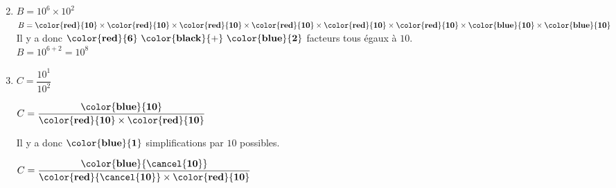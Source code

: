         \begin{enumerate}
            \setcounter{enumi}{1}
            \item $B=10^6\times 10^2$\\
            $B=\mathbf{\color{red}{10}} \times \mathbf{\color{red}{10}}\times \mathbf{\color{red}{10}}\times \mathbf{\color{red}{10}}\times \mathbf{\color{red}{10}}\times \mathbf{\color{red}{10}} \times \mathbf{\color{blue}{10}} \times \mathbf{\color{blue}{10}}$\\
            Il y a donc $\mathbf{\color{red}{6}~\color{black}{+}~\color{blue}{2}}$ facteurs tous égaux à $10$.\\
            $B=10^{6+2} = 10^{8}$
            \item $C=\dfrac{10^1}{10^2}$

            \medskip
            $C=\dfrac{\mathbf{\color{blue}{10}}}{\mathbf{\color{red}{10}} \times \mathbf{\color{red}{10}}}$

            \medskip
            Il y a donc $\mathbf{\color{blue}{1}}$ simplifications par $10$ possibles.

            \medskip
            $C=\dfrac{\mathbf{\color{blue}{\cancel{10}}}}{\mathbf{\color{red}{\cancel{10}}}\times\mathbf{\color{red}{10}}}$


\end{enumerate}
